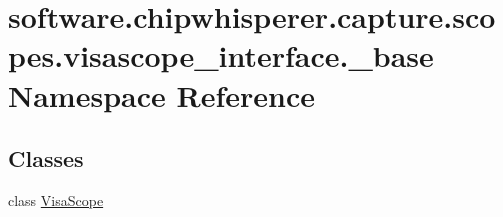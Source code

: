 \hypertarget{namespacesoftware_1_1chipwhisperer_1_1capture_1_1scopes_1_1visascope__interface_1_1__base}{}\section{software.\+chipwhisperer.\+capture.\+scopes.\+visascope\+\_\+interface.\+\_\+base Namespace Reference}
\label{namespacesoftware_1_1chipwhisperer_1_1capture_1_1scopes_1_1visascope__interface_1_1__base}
\subsection*{Classes}
\begin{DoxyCompactItemize}
\item 
class \hyperlink{classsoftware_1_1chipwhisperer_1_1capture_1_1scopes_1_1visascope__interface_1_1__base_1_1VisaScope}{Visa\+Scope}
\end{DoxyCompactItemize}
